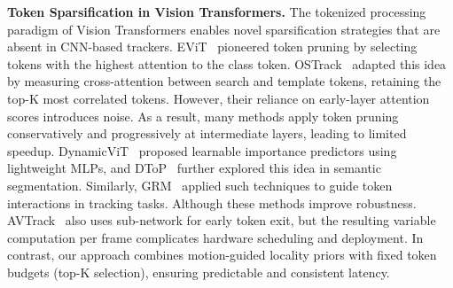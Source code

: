 \textbf{Token Sparsification in Vision Transformers.}
The tokenized processing paradigm of Vision Transformers enables novel sparsification strategies that are absent in CNN-based trackers. EViT~\cite{evit} pioneered token pruning by selecting tokens with the highest attention to the class token. OSTrack~\cite{ostrack} adapted this idea by measuring cross-attention between search and template tokens, retaining the top-K most correlated tokens. However, their reliance on early-layer attention scores introduces noise. 
As a result, many methods apply token pruning conservatively and progressively at intermediate layers, leading to limited speedup.
DynamicViT~\cite{dynamicvit} proposed learnable importance predictors using lightweight MLPs, and DToP~\cite{DTP4SS} further explored this idea in semantic segmentation. Similarly, GRM~\cite{grm} applied such techniques to guide token interactions in tracking tasks. Although these methods improve robustness. AVTrack~\cite{AVTrack} also uses sub-network for early token exit, but the resulting variable computation per frame complicates hardware scheduling and deployment. In contrast, our approach combines motion-guided locality priors with fixed token budgets (top-K selection), ensuring predictable and consistent latency.